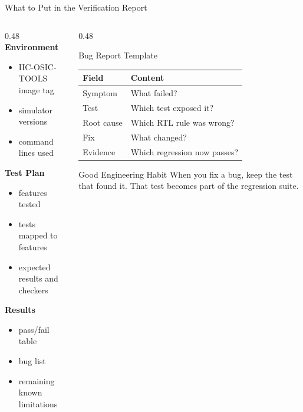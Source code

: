 \documentclass[aspectratio=169,10pt]{beamer}
\begin{document}
\begin{frame}{What to Put in the Verification Report}
  \begin{columns}[T]
    \begin{column}{0.48\textwidth}
      \textbf{Environment}
      \begin{itemize}
        \item IIC-OSIC-TOOLS image tag
        \item simulator versions
        \item command lines used
      \end{itemize}

      \vspace{0.6em}
      \textbf{Test Plan}
      \begin{itemize}
        \item features tested
        \item tests mapped to features
        \item expected results and checkers
      \end{itemize}

      \vspace{0.6em}
      \textbf{Results}
      \begin{itemize}
        \item pass/fail table
        \item bug list
        \item remaining known limitations
      \end{itemize}
    \end{column}
    \begin{column}{0.48\textwidth}
      \begin{block}{Bug Report Template}
        \renewcommand{\arraystretch}{1.15}
        \scriptsize
        \begin{tabular}{p{2.3cm}p{4.2cm}}
          \toprule
          Field & Content \\
          \midrule
          Symptom & What failed? \\
          Test & Which test exposed it? \\
          Root cause & Which RTL rule was wrong? \\
          Fix & What changed? \\
          Evidence & Which regression now passes? \\
          \bottomrule
        \end{tabular}
      \end{block}

      \vspace{0.7em}
      \begin{exampleblock}{Good Engineering Habit}
        When you fix a bug, keep the test that found it. That test becomes part of the regression suite.
      \end{exampleblock}
    \end{column}
  \end{columns}
\end{frame}
\end{document}

